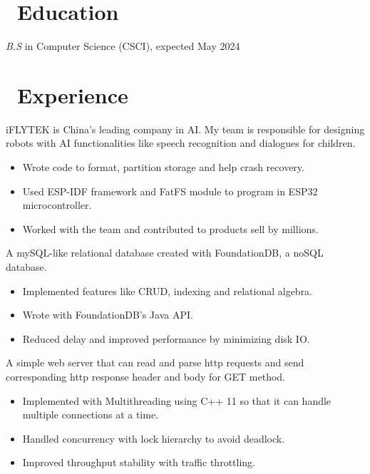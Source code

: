 \documentclass{resume}
\begin{document}



\section{\faGraduationCap\ Education}
\textit{B.S} in Computer Science (CSCI), expected May 2024

\section{\faUsers\ Experience}
  iFLYTEK is China's leading company in AI. My team is responsible for designing robots with AI functionalities like speech recognition and dialogues for children.
\begin{itemize}
  \item Wrote code to format, partition storage and help crash recovery.
  \item Used ESP-IDF framework and FatFS module to program in ESP32 microcontroller.
  \item Worked with the team and contributed to products sell by millions.
\end{itemize}

  A mySQL-like relational database created with FoundationDB, a noSQL database.
\begin{itemize}
  \item Implemented features like CRUD, indexing and relational algebra.
  \item Wrote with FoundationDB's Java API.
  \item Reduced delay and improved performance by minimizing disk IO.
\end{itemize}

  A simple web server that can read and parse http requests and send corresponding http response header and body for GET method.
\begin{itemize}
  \item Implemented with Multithreading using C++ 11 so that it can handle multiple connections at a time.
  \item Handled concurrency with lock hierarchy to avoid deadlock.
  \item Improved throughput stability with traffic throttling.
\end{itemize}
\end{document}
